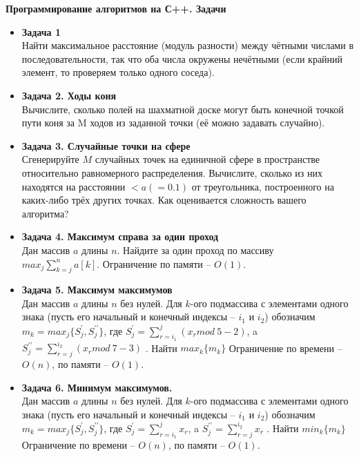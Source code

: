 \documentclass{article}
\begin{document}
\thispagestyle{empty}
\begin{center}
\Large
\textbf{Программирование алгоритмов на С++. Задачи}
\end{center}
	
\vspace{1 cm}
\Large			
						
\begin{itemize}

\item \textbf{Задача 1} \\
Найти максимальное расстояние (модуль разности) между чётными числами в последовательности, так что оба числа окружены нечётными (если крайний элемент, то проверяем только одного соседа).

\item \textbf{Задача 2. Ходы коня} \\
Вычислите, сколько полей на шахматной доске могут быть конечной точкой пути коня за M ходов из заданной точки (её можно задавать случайно).

\item \textbf{Задача 3. Случайные точки на сфере} \\
Сгенерируйте $M$ случайных точек на единичной сфере в пространстве относительно равномерного распределения. 
Вычислите, сколько из них находятся на расстоянии $ < a ( = 0.1 )$ от треугольника, построенного на каких-либо трёх других точках. 
Как оценивается сложность вашего алгоритма? 

\item \textbf{Задача 4. Максимум справа за один проход} \\
Дан массив $a$ длины $n$. Найдите за один проход по массиву \\$max_j \sum_{k=j}^na[k]$. Ограничение по памяти -- $O(1)$.

\item \textbf{Задача 5. Максимум максимумов} \\
Дан массив $a$ длины $n$  без нулей. Для $k$-ого подмассива с элементами одного знака (пусть его начальный и конечный индексы -- $i_1$ и $i_2$)
обозначим $m_k = max_j\{S_j^\prime, S_j^{\prime\prime}\}$, где $S_j^\prime = \sum_{r=i_1}^j(x_r mod\ 5 - 2)$, a $S_j^{\prime\prime} = \sum_{r=j}^{i_2}(x_r mod\ 7 - 3)$ . 
Найти $max_k\{m_k\}$
Ограничение по времени -- $O(n)$, по памяти -- $O(1)$.

\item \textbf{Задача 6. Минимум максимумов.} \\
Дан массив $a$ длины $n$  без нулей. Для $k$-ого подмассива с элементами одного знака (пусть его начальный и конечный индексы -- $i_1$ и $i_2$)
обозначим $m_k = max_j\{S_j^\prime, S_j^{\prime\prime}\}$, где $S_j^\prime = \sum_{r=i_1}^jx_r$, a $S_j^{\prime\prime} = \sum_{r=j}^{i_2}x_r$ . 
Найти $min_k\{m_k\}$
Ограничение по времени -- $O(n)$, по памяти -- $O(1)$.


\end{itemize}
\end{document}
